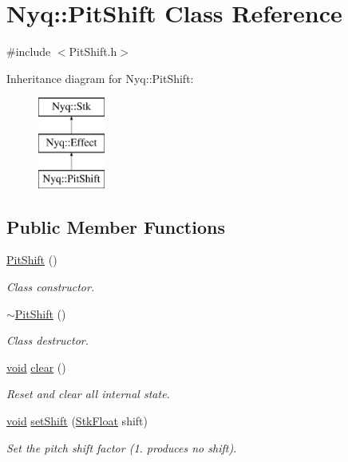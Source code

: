 \hypertarget{class_nyq_1_1_pit_shift}{}\section{Nyq\+:\+:Pit\+Shift Class Reference}
\label{class_nyq_1_1_pit_shift}


{\ttfamily \#include $<$Pit\+Shift.\+h$>$}

Inheritance diagram for Nyq\+:\+:Pit\+Shift\+:\begin{figure}[H]
\begin{center}
\leavevmode
\includegraphics[height=3.000000cm]{class_nyq_1_1_pit_shift}
\end{center}
\end{figure}
\subsection*{Public Member Functions}
\begin{DoxyCompactItemize}
\item 
\hyperlink{class_nyq_1_1_pit_shift_af8402c8b1f8d9b8f9bd033370722707a}{Pit\+Shift} ()
\begin{DoxyCompactList}\small\item\em Class constructor. \end{DoxyCompactList}\item 
\hyperlink{class_nyq_1_1_pit_shift_ab6e81aa888388f531fd009188acf2ca8}{$\sim$\+Pit\+Shift} ()
\begin{DoxyCompactList}\small\item\em Class destructor. \end{DoxyCompactList}\item 
\hyperlink{sound_8c_ae35f5844602719cf66324f4de2a658b3}{void} \hyperlink{class_nyq_1_1_pit_shift_af820c93dad6dc1a2778f825cc502a63b}{clear} ()
\begin{DoxyCompactList}\small\item\em Reset and clear all internal state. \end{DoxyCompactList}\item 
\hyperlink{sound_8c_ae35f5844602719cf66324f4de2a658b3}{void} \hyperlink{class_nyq_1_1_pit_shift_a81627a65c4affcf55863c2b00d45bccf}{set\+Shift} (\hyperlink{namespace_nyq_a044fa20a706520a617bbbf458a7db7e4}{Stk\+Float} shift)
\begin{DoxyCompactList}\small\item\em Set the pitch shift factor (1. produces no shift). \end{DoxyCompactList}\end{DoxyCompactItemize}
